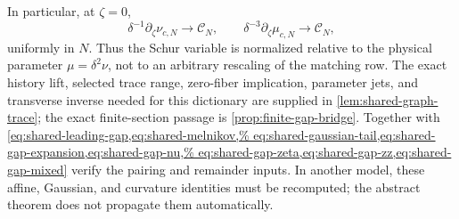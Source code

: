 In particular, at \(\zeta=0\),
\begin{equation}
 \delta^{-1}\partial_\zeta\nu_{c,N}\longrightarrow\mathscr C_N,
 \qquad
 \delta^{-3}\partial_\zeta\mu_{c,N}\longrightarrow\mathscr C_N,
                                                               \label{eq:abstract-current-scaling}
\end{equation}
uniformly in \(N\).  Thus the Schur variable is normalized relative to the
physical parameter \(\mu=\delta^2\nu\), not to an arbitrary rescaling of the
matching row.
The exact history lift, selected trace range, zero-fiber implication,
parameter jets, and transverse inverse needed for this dictionary are
supplied in
\cref{lem:shared-graph-trace}; the exact finite-section passage is
\cref{prop:finite-gap-bridge}.  Together with
\cref{eq:shared-leading-gap,eq:shared-melnikov,%
eq:shared-gaussian-tail,eq:shared-gap-expansion,eq:shared-gap-nu,%
eq:shared-gap-zeta,eq:shared-gap-zz,eq:shared-gap-mixed}
verify the pairing and remainder inputs.  In another model, these affine,
Gaussian, and curvature identities must be recomputed; the abstract theorem
does not propagate them automatically.
